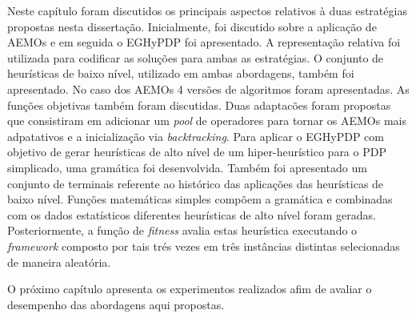 Neste capítulo foram discutidos os principais aspectos relativos à duas estratégias propostas nesta dissertação. Inicialmente, foi discutido sobre a aplicação de AEMOs e em seguida o EGHyPDP foi apresentado. A representação relativa foi utilizada para codificar as soluções para ambas as estratégias. O conjunto de heurísticas de baixo nível, utilizado em ambas abordagens, também foi apresentado. No caso dos AEMOs 4 versões de algoritmos foram apresentadas. As funções objetivas também foram discutidas. Duas adaptacões foram propostas que consistiram em adicionar um \textit{pool} de operadores para tornar os AEMOs mais adpatativos e a inicialização via \textit{backtracking}. Para aplicar o EGHyPDP com objetivo de gerar heurísticas de alto nível de um  hiper-heurístico para o PDP simplicado, uma  gramática foi desenvolvida. Também foi apresentado um conjunto de terminais referente ao histórico das aplicações das heurísticas de baixo nível. Funções matemáticas simples compõem a gramática e combinadas com os dados estatísticos diferentes heurísticas de alto nível foram geradas. Posteriormente, a função de \textit{fitness} avalia estas heurística executando o \textit{framework} composto por tais trés vezes em três instâncias distintas selecionadas de maneira aleatória.
 
 O próximo capítulo apresenta os experimentos realizados afim de avaliar o desempenho das abordagens aqui propostas.



